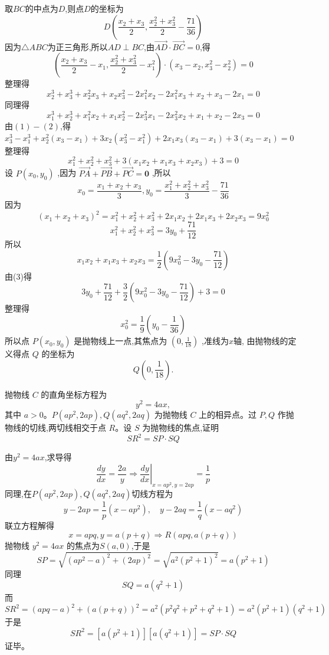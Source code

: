 \begin{questions}
\begin{solution}
        取$BC$的中点为$D$,则点$D$的坐标为$$D(\frac{x_2+x_3}{2},\frac{x_2^2+x_3^2}{2}-\frac{71}{36})$$
        因为$\triangle ABC$为正三角形,所以$AD \perp BC$,由$\overrightarrow{AD}\cdot\overrightarrow{BC}=0$,得$$(\frac{x_2+x_3}{2}-x_1,\frac{x_2^2+x_3^2}{2}-x_1^2)\cdot(x_3-x_2,x_3^2-x_2^2)=0$$
        整理得
        \[
        x_2^3+x_3^3+x_2^2x_3+x_2x_3^2-2x_1^2x_2-2x_1^2x_3+x_2+x_3-2x_1=0 \tag{1} 
        \]
        同理得
        \[
        x_1^3+x_2^3+x_1^2x_2+x_1x_2^2-2x_3^2x_1-2x_3^2x_2+x_1+x_2-2x_3=0 \tag{2} 
        \]
        由$(1)-(2)$,得$x_3^3-x_1^3+x_2^2(x_3-x_1)+3x_2(x_3^2-x_1^2)+2x_1x_3(x_3-x_1)+3(x_3-x_1)=0$
        整理得\[
        x_1^2+x_2^2+x_3^2+3(x_1x_2+x_1x_3+x_2x_3)+3=0 \tag{3}
        \]
        设 $P(x_{0},y_{0})$ ,因为 $\overrightarrow{PA}+\overrightarrow{PB}+\overrightarrow{PC}=\textbf{0}$ ,所以 $$x_{0}=\frac{x_{1}+x_{2}+x_{3}}{3},y_{0}=\frac{x_{1}^{2}+x_{2}^{2}+x_{3}^{2}}{3}-\frac{71}{36}$$
        因为 $$(x_{1}+x_{2}+x_{3})^{2}=x_{1}^{2}+x_{2}^{2}+x_{3}^{2}+2x_{1}x_{2}+2x_{1}x_{3}+2x_{2}x_{3}=9x_{0}^{2}$$
        $$x_{1}^{2}+x_{2}^{2}+x_{3}^{2}=3y_{0}+\frac{71}{12}$$
        所以 $$x_{1}x_{2}+x_{1}x_{3}+x_{2}x_{3}=\frac{1}{2}(9x_{0}^{2}-3y_{0}-\frac{71}{12})$$
        由(3)得 $$3y_{0}+\frac{71}{12}+\frac{3}{2}(9x_{0}^{2}-3y_{0}-\frac{71}{12})+3=0$$
        整理得 $$x_{0}^{2}=\frac{1}{9}(y_{0}-\frac{1}{36})$$
        所以点 $P(x_{0},y_{0})$ 是抛物线上一点,其焦点为 $(0,\frac{1}{18})$ ,准线为$x$轴,
        由抛物线的定义得点 $Q$ 的坐标为 $$Q(0,\frac{1}{18}).$$
    \end{solution}

    \question 抛物线 $C$ 的直角坐标方程为
    \[
    y^2 = 4ax,
    \]
    其中 $a>0$。$P(ap^2,2ap),Q(aq^2,2aq)$ 为抛物线 $C$ 上的相异点。过 $P,Q$ 作抛物线的切线,两切线相交于点 $R$。设 $S$ 为抛物线的焦点,证明
    \[
    SR^2 = SP \cdot SQ
    \]
    \begin{solution}
        由$y^2 = 4ax$,求导得
        \[
        \frac{dy}{dx}=\frac{2a}{y} \Rightarrow \left.\frac{dy}{dx}\right|_{x=ap^2,y=2ap} =\frac{1}{p}
        \]
        同理,在$P(ap^2,2ap),Q(aq^2,2aq)$切线方程为
        \[
        y-2ap=\frac{1}{p}(x-ap^2),\quad y-2aq=\frac{1}{q}(x-aq^2)
        \]
        联立方程解得
        \[
        x=apq,y=a(p+q) \Rightarrow R(apq,a(p+q))
        \]
        抛物线 $y^2=4ax$ 的焦点为$S(a,0)$,于是
        \[
        SP=\sqrt{(ap^2-a)^2+(2ap)^2}=\sqrt{a^2(p^2+1)^2}=a(p^2+1)
        \]
        同理
        \[
        SQ=a(q^2+1)
        \]
        而
        \[
        SR^2=(apq-a)^2+(a(p+q))^2 =a^2(p^2q^2+p^2+q^2+1) =a^2(p^2+1)(q^2+1)
        \]
        于是
        \[
        SR^2=[a(p^2+1)][a(q^2+1)]=SP \cdot SQ
        \]
        证毕。
    \end{solution}


\end{questions}

